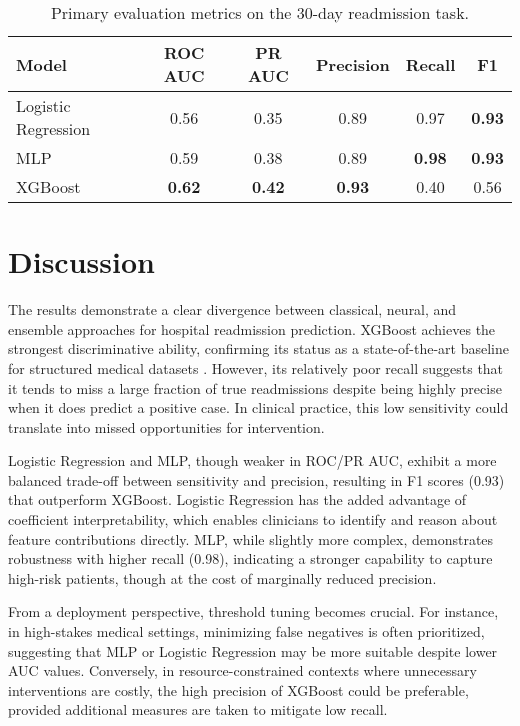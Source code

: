 \documentclass{article}
\begin{document}
\begin{table}[ht]
\centering
\caption{Primary evaluation metrics on the 30-day readmission task.}
\label{tab:results}
\begin{tabular}{lccccc}
\toprule
Model & ROC AUC & PR AUC & Precision & Recall & F1 \\
\midrule
Logistic Regression & 0.56 & 0.35 & 0.89 & 0.97 & \textbf{0.93} \\
MLP                 & 0.59 & 0.38 & 0.89 & \textbf{0.98} & \textbf{0.93} \\
XGBoost             & \textbf{0.62} & \textbf{0.42} & \textbf{0.93} & 0.40 & 0.56 \\
\bottomrule
\end{tabular}
\end{table}


\section{Discussion}
The results demonstrate a clear divergence between classical, neural, and ensemble approaches for hospital readmission prediction. XGBoost achieves the strongest discriminative ability, confirming its status as a state-of-the-art baseline for structured medical datasets \cite{chen2016xgboost}. However, its relatively poor recall suggests that it tends to miss a large fraction of true readmissions despite being highly precise when it does predict a positive case. In clinical practice, this low sensitivity could translate into missed opportunities for intervention. 

Logistic Regression and MLP, though weaker in ROC/PR AUC, exhibit a more balanced trade-off between sensitivity and precision, resulting in F1 scores (0.93) that outperform XGBoost. Logistic Regression has the added advantage of coefficient interpretability, which enables clinicians to identify and reason about feature contributions directly. MLP, while slightly more complex, demonstrates robustness with higher recall (0.98), indicating a stronger capability to capture high-risk patients, though at the cost of marginally reduced precision. 

From a deployment perspective, threshold tuning becomes crucial. For instance, in high-stakes medical settings, minimizing false negatives is often prioritized, suggesting that MLP or Logistic Regression may be more suitable despite lower AUC values. Conversely, in resource-constrained contexts where unnecessary interventions are costly, the high precision of XGBoost could be preferable, provided additional measures are taken to mitigate low recall. 
\end{document}
